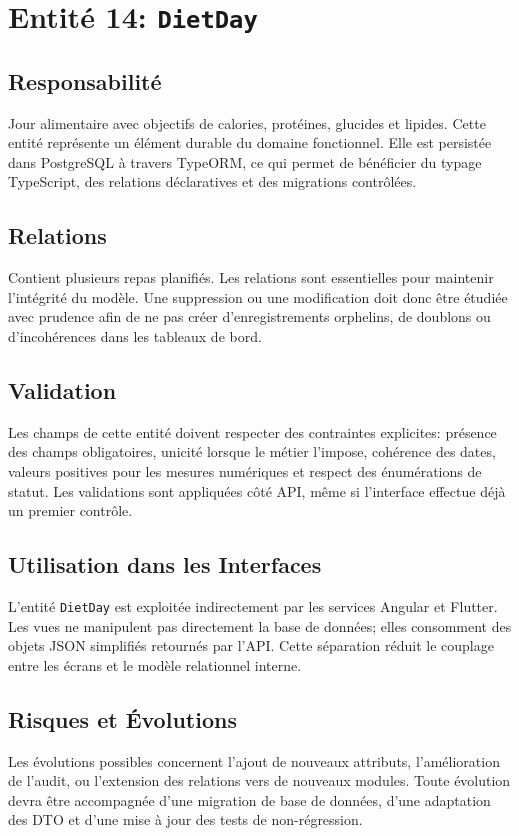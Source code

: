 \section{Entité 14: \texttt{DietDay}}
\subsection{Responsabilité}
Jour alimentaire avec objectifs de calories, protéines, glucides et lipides. Cette entité représente un élément durable du domaine fonctionnel. Elle est persistée dans PostgreSQL à travers TypeORM, ce qui permet de bénéficier du typage TypeScript, des relations déclaratives et des migrations contrôlées.

\subsection{Relations}
Contient plusieurs repas planifiés. Les relations sont essentielles pour maintenir l'intégrité du modèle. Une suppression ou une modification doit donc être étudiée avec prudence afin de ne pas créer d'enregistrements orphelins, de doublons ou d'incohérences dans les tableaux de bord.

\subsection{Validation}
Les champs de cette entité doivent respecter des contraintes explicites: présence des champs obligatoires, unicité lorsque le métier l'impose, cohérence des dates, valeurs positives pour les mesures numériques et respect des énumérations de statut. Les validations sont appliquées côté API, même si l'interface effectue déjà un premier contrôle.

\subsection{Utilisation dans les Interfaces}
L'entité \texttt{DietDay} est exploitée indirectement par les services Angular et Flutter. Les vues ne manipulent pas directement la base de données; elles consomment des objets JSON simplifiés retournés par l'API. Cette séparation réduit le couplage entre les écrans et le modèle relationnel interne.

\subsection{Risques et Évolutions}
Les évolutions possibles concernent l'ajout de nouveaux attributs, l'amélioration de l'audit, ou l'extension des relations vers de nouveaux modules. Toute évolution devra être accompagnée d'une migration de base de données, d'une adaptation des DTO et d'une mise à jour des tests de non-régression.

